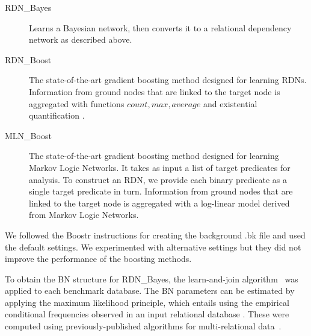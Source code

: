 \documentclass[runningheads,a4paper]{llncs}
\begin{document}
\begin{description}
\item[RDN\_Bayes] Learns a Bayesian network, then converts it to a relational dependency network as described above.
\item[RDN\_Boost] The state-of-the-art gradient boosting method designed for learning RDNs. Information from ground nodes that are linked to the target node is aggregated with functions $count, max, average$ and existential quantification \cite{Natarajan2012}.
\item[MLN\_Boost] The state-of-the-art gradient boosting method designed for learning Markov Logic Networks. It takes as input a  list of target predicates for analysis. To construct an RDN, we provide each binary predicate as a single target predicate in turn. Information from ground nodes that are linked to the target node is aggregated with a log-linear model derived from Markov Logic Networks.
\end{description}
We followed the Boostr instructions for creating the background .bk file and used the default settings. We experimented with alternative settings but they did not improve the performance of the boosting methods.


To obtain the BN structure for RDN\_Bayes, the learn-and-join algorithm~\cite{Schulte2012} was applied to each benchmark database. The BN parameters can be estimated by applying the maximum likelihood principle, which entails using the empirical conditional frequencies observed in an input relational database \cite{Schulte2011,Schulte2014}. 
These were computed using previously-published algorithms for multi-relational data~\cite{Schulte2014}. 
\end{document}
